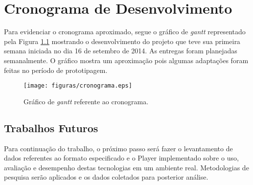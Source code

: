 \chapter[Cronograma de Desenvolvimento]{Cronograma de Desenvolvimento}\label{cap5}

Para evidenciar o cronograma aproximado, segue o gráfico de \textit{gantt} representado pela Figura \ref{cronograma} mostrando o desenvolvimento do projeto que teve sua primeira semana iniciada no dia 16 de setembro de 2014. As entregas foram planejadas semanalmente. O gráfico mostra um aproximação pois algumas adaptações foram feitas no período de prototipagem.


 \begin{figure}[ht]
	\centering
		\texttt{[image: figuras/cronograma.eps]}
	\caption{Gráfico de \textit{gantt} referente ao cronograma.}
	\label{cronograma}
\end{figure}

\section{Trabalhos Futuros}

Para continuação do trabalho, o próximo passo será fazer o levantamento de dados referentes ao formato especificado e o Player implementado sobre o uso, avaliação e desempenho destas tecnologias em um ambiente real. Metodologias de pesquisa serão aplicados e os dados coletados para posterior análise. 